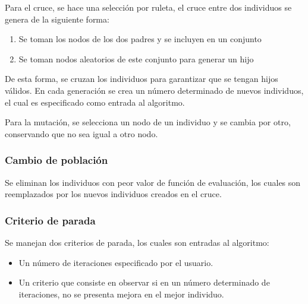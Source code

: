 Para el cruce, se hace una selección por ruleta\cite{9788497321839}, el cruce entre dos individuos se genera de la siguiente forma:

\begin{enumerate}
    \item Se toman los nodos de los dos padres y se incluyen en un conjunto
    \item Se toman nodos aleatorios de este conjunto para generar un hijo
\end{enumerate}

De esta forma, se cruzan los individuos para garantizar que se tengan hijos válidos. En cada generación se crea un número determinado de nuevos individuos, el cual es especificado como entrada al algoritmo.

Para la mutación, se selecciona un nodo de un individuo y se cambia por otro, conservando que no sea igual a otro nodo.

\subsubsection{Cambio de población}

Se eliminan los individuos con peor valor de función de evaluación, los cuales son reemplazados por los nuevos individuos creados en el cruce.


\subsubsection{Criterio de parada}

Se manejan dos criterios de parada, los cuales son entradas al algoritmo:

\begin{itemize}
    \item Un número de iteraciones especificado por el usuario.
    \item Un criterio que consiste en observar si en un número determinado de iteraciones, no se presenta mejora en el mejor individuo.
\end{itemize}

